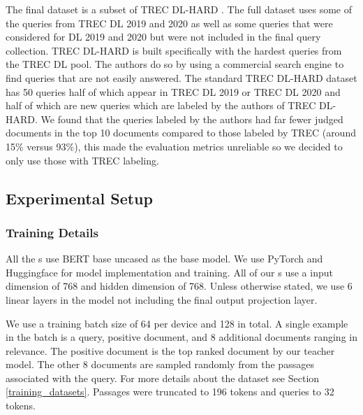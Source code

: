 \documentclass[sigconf,]{acmart}
\begin{document}
The final dataset is a subset of TREC DL-HARD \cite{TREC_DL_HARD}. The full dataset uses some of the queries from TREC DL 2019 and 2020 as well as some queries that were considered for DL 2019 and 2020 but were not included in the final query collection. TREC DL-HARD is built specifically with the hardest queries from the TREC DL pool. The authors do so by using a commercial search engine to find queries that are not easily answered. The standard TREC DL-HARD dataset has 50 queries half of which appear in TREC DL 2019 or TREC DL 2020 and half of which are new queries which are labeled by the authors of TREC DL-HARD. We found that the queries labeled by the authors had far fewer judged documents in the top 10 documents compared to those labeled by TREC (around 15\% versus 93\%), this made the evaluation metrics unreliable so we decided to only use those with TREC labeling. %

\subsection{Experimental Setup} \label{sec:ExperimentalSetup}
\subsubsection{Training Details}
All the \name{}s use BERT \cite{BERT} base uncased as the base model. We use PyTorch and Huggingface for model implementation and training. All of our \mininame{}s use a input dimension of 768 and hidden dimension of 768. Unless otherwise stated, we use 6 linear layers in the model not including the final output projection layer.

We use a training batch size of 64 per device and 128 in total. A single example in the batch is a query, positive document, and 8 additional documents ranging in relevance. The positive document is the top ranked document by our teacher model. The other 8 documents are sampled randomly from the passages associated with the query. For more details about the dataset see Section \ref{training_datasets}. Passages were truncated to 196 tokens and queries to 32 tokens.
\end{document}
